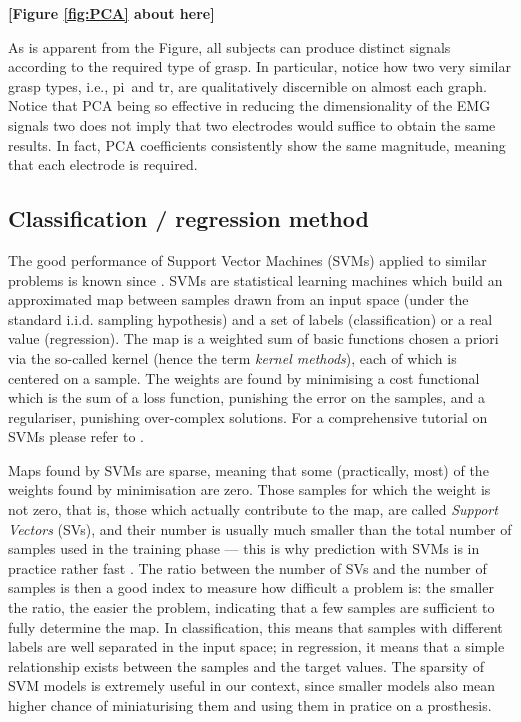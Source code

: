 \documentclass[review,authoryear]{elsarticle}
\def\pi{\textsf{pi}}
\def\tr{\textsf{tr}}
\renewcommand{\cite}{\citep}
\begin{document}
\noindent \textbf{[Figure \ref{fig:PCA} about here]}

As is apparent from the Figure, all subjects can produce distinct signals
according to the required type of grasp. In particular,
notice how two very similar grasp types, i.e.,
\pi\ and \tr, are qualitatively discernible on almost each graph.
Notice that PCA being so effective in reducing the
dimensionality of the EMG signals two does not imply that
two electrodes would suffice to obtain the same results. In fact, PCA coefficients
consistently show the same magnitude, meaning that each electrode
is required.

\subsection{Classification / regression method}
\label{subsec:method}

The good performance of Support Vector Machines (SVMs) applied to similar
problems is known since \cite{smagt06}. SVMs are
statistical learning machines \cite{v-edbed-82} which build an approximated map between
samples drawn from an input space (under the standard i.i.d. sampling hypothesis)
and a set of labels (classification) or a real value (regression).
The map is a weighted sum of basic functions chosen a priori
via the so-called kernel (hence the term \emph{kernel methods}), each of
which is centered on a sample.
The weights are found by minimising a cost functional which is the sum of
a loss function, punishing the error on the samples, and a regulariser, punishing
over-complex solutions. For a comprehensive tutorial on SVMs please refer to
\cite{Burges98,SmolaTut2004}.

Maps found by SVMs are sparse, meaning that some (practically, most) of the
weights found by minimisation are zero.
Those samples for which the weight is not zero, that is, those which actually
contribute to the map, are called \emph{Support Vectors}
(SVs), and their number is usually much smaller
than the total number of samples used in the training phase --- this is why
prediction with SVMs is in practice rather fast \cite{Cristianini00}. The
ratio between the number of SVs and the number of samples is then a good index
to measure how difficult a problem is: the smaller the ratio, the easier
the problem, indicating that a few samples are sufficient to
fully determine the map. In classification, this means that samples with different
labels are well separated in the input space; in regression, it means that a
simple relationship exists between the samples and the target values.
The sparsity of SVM models is extremely useful in our context, since
smaller models also mean higher chance of miniaturising them and using them
in pratice on a prosthesis.
\end{document}
